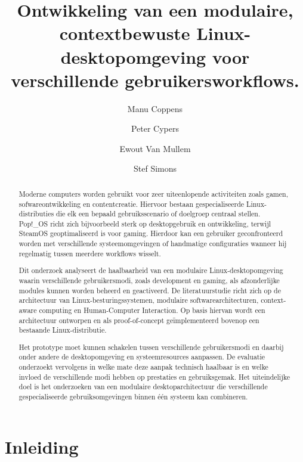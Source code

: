 \documentclass{hogent-article}
\title{Ontwikkeling van een modulaire, contextbewuste Linux-desktopomgeving voor verschillende gebruikersworkflows.}
\author{Manu Coppens}
\author{Peter Cypers}
\author{Ewout Van Mullem}
\author{Stef Simons}
\begin{document}
\begin{abstract}
  Moderne computers worden gebruikt voor zeer uiteenlopende activiteiten zoals gamen, sofwareontwikkeling en contentcreatie. Hiervoor bestaan gespecialiseerde Linux-distributies die elk een bepaald gebruiksscenario of doelgroep centraal stellen. Pop!\_OS richt zich bijvoorbeeld sterk op desktopgebruik en ontwikkeling, terwijl SteamOS geoptimaliseerd is voor gaming. Hierdoor kan een gebruiker geconfronteerd worden met verschillende systeemomgevingen of handmatige configuraties wanneer hij regelmatig tussen meerdere workflows wisselt.
  
  Dit onderzoek analyseert de haalbaarheid van een modulaire Linux-desktopomgeving waarin verschillende gebruikersmodi, zoals development en gaming, als afzonderlijke modules kunnen worden beheerd en geactiveerd. De literatuurstudie richt zich op de architectuur van Linux-besturingssystemen, modulaire softwarearchitecturen, context-aware computing en Human-Computer Interaction. Op basis hiervan wordt een architectuur ontworpen en als proof-of-concept geïmplementeerd bovenop een bestaande Linux-distributie.
  
  Het prototype moet kunnen schakelen tussen verschillende gebruikersmodi en daarbij onder andere de desktopomgeving en systeemresources aanpassen. De evaluatie onderzoekt vervolgens in welke mate deze aanpak technisch haalbaar is en welke invloed de verschillende modi hebben op prestaties en gebruiksgemak. Het uiteindelijke doel is het onderzoeken van een modulaire desktoparchitectuur die verschillende gespecialiseerde gebruiksomgevingen binnen één systeem kan combineren.
\end{abstract}

\tableofcontents

\section{Inleiding}%
\label{sec:inleiding}

\end{document}
